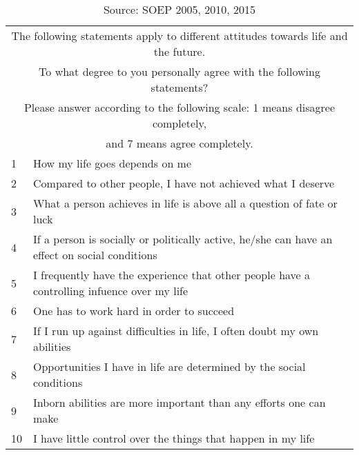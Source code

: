 \documentclass[12pt,a4paper,fleqn]{article}
\begin{document}
\begin{table}[h!]
	\centering
	\begin{tabular}{ |p{1cm}||p{14cm}|  }
	\hline
	\multicolumn{2}{|c|}{The following statements apply to different attitudes towards life and the future.} \\
	\multicolumn{2}{|c|}{To what degree to you personally agree with the following statements?} \\
	\multicolumn{2}{|c|}{Please answer according to the following scale: 1 means disagree completely,}\\
	\multicolumn{2}{|c|}{and 7 means agree completely.}   \\
	\hline
	1   & How my life goes depends on me    \\
	2&   Compared to other people, I have not achieved what I deserve  \\
	3 & What a person achieves in life is above all a question of fate or luck\\
	4 & If a person is socially or politically active, he/she can have an effect on social conditions\\
	5& I frequently have the experience that other people have a controlling infuence over my life\\
	6 & One has to work hard in order to succeed\\
	7 & If I run up against difficulties in life, I often doubt my own abilities\\
	8 & Opportunities I have in life are determined by the social conditions\\
	9 & Inborn abilities are more important than any efforts one can make\\
	10 & I have little control over the things that happen in my life\\
	\hline
	\end{tabular}
	\caption{Source: SOEP 2005, 2010, 2015}
\end{table}
\end{document}
